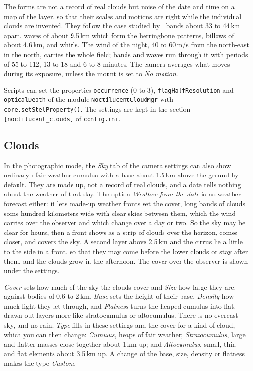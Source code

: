 The forms are not a record of real clouds but noise of the date and
time on a map of the layer, so that their scales and motions are right
while the individual clouds are invented. They follow the case studied
by \citet{Dalin:2004:NLCWaves}: bands about 33 to 44\,km apart, waves of
about 9.5\,km which form the herringbone patterns, billows of about
4.6\,km, and whirls. The wind of the night, 40 to 60\,m/s from the
north-east in the north, carries the whole field; bands and waves run
through it with periods of 55 to 112, 13 to 18 and 6 to 8 minutes. The
camera averages what moves during its exposure, unless the mount is set to
\emph{No motion}.

Scripts can set the properties \texttt{occurrence} (0 to 3),
\texttt{flagHalfResolution} and \texttt{opticalDepth} of the module
\texttt{NoctilucentCloudMgr} with \texttt{core.setStelProperty()}.
The settings are kept in the section \texttt{[noctilucent\_clouds]}
of \texttt{config.ini}.

\subsection{Clouds}
\label{sec:phenomena:Clouds}

In the photographic mode, the \emph{Sky} tab of the camera settings can
also show ordinary : fair weather cumulus with a base
about 1.5\,km above the ground by default. They are made up, not a record of real
clouds, and a date tells nothing about the weather of that day. The
option \emph{Weather from the date} is no weather forecast either: it
lets made-up weather fronts set the cover, long bands of clouds some
hundred kilometers wide with clear skies between them, which the wind
carries over the observer and which change over a day or two. So the sky
may be clear for hours, then a front shows as a strip of clouds over the
horizon, comes closer, and covers the sky. A second layer above 2.5\,km and
the cirrus lie a little to the side in a front, so that they may come
before the lower clouds or stay after them, and the clouds grow in the
afternoon. The cover over the observer is shown under the settings.

\emph{Cover} sets how much of the sky the clouds cover and \emph{Size}
how large they are, against bodies of 0.6 to 2\,km. \emph{Base} sets the
height of their base, \emph{Density} how much light they let through, and
\emph{Flatness} turns the heaped cumulus into flat, drawn out layers more
like stratocumulus or altocumulus. There is no overcast sky, and no rain.
\emph{Type} fills in these settings and the cover for a kind of cloud,
which you can then change: \emph{Cumulus}, heaps of fair weather;
\emph{Stratocumulus}, large and flatter masses close together about
1\,km up; and \emph{Altocumulus}, small, thin and flat elements about
3.5\,km up. A change of the base, size, density or flatness makes the
type \emph{Custom}.

